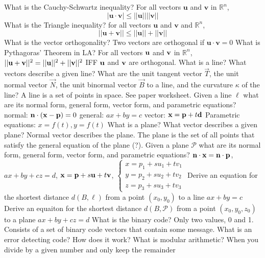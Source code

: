 \documentclass{article}
\begin{document}
\begin{outline}[enumerate]
        \1 What is the Cauchy-Schwartz inequality?
            \2 For all vectors \(\mathbf u\) and \(\mathbf v\) in \(\mathbb R^n\), \[|\mathbf{u\cdot v}|\leq ||\mathbf u||||\mathbf v||\]
        \1 What is the Triangle inequality?
            \2 for all vectors \(\mathbf u\) and \(\mathbf v\) and \(\mathbb R^n\), \[||\mathbf u+\mathbf v||\leq||\mathbf u||+||\mathbf v||\]
        \1 What is the vector orthogonality?
            \2 Two vectors are orthogonal if \(\mathbf u\cdot\mathbf v=0\)
        \1 What is Pythagoras' Theorem in LA?
            \2 For all vectors \(\vb u\) and \(\vb v\) in \(\mathbb R^n\), \(||\vb u+\vb v||^2=||\vb u||^2+||\vb v||^2\) IFF \(\vb u\) and \(\vb v\) are orthogonal. 
        \1 What is a line? What vectors describe a given line? What are the unit tangent vector \(\vec T\), the unit normal vector \(\vec N\), the unit binormal vector \(\vec B\) to a line, and the curvature \(\kappa\) of the line?
            \2 A line is a set of points in space. See paper worksheet. 
        \1 Given a line \(\ell\) what are its normal form, general form, vector form, and parametric equations?
            \2 normal: \(\vb n\cdot (\vb x-\vb p)=0\)
            \2 general: \(ax+by=c\)
            \2 vector: \(\vb x=\vb p+t\vb d\)
            \2 Parametric equations: \(x=f(t),y=f(t)\)
        \1 What is a plane? What vector describes a given plane?
            \2 Normal vector describes the plane. The plane is the set of all points that satisfy the general equation of the plane (?). 
        \1 Given a plane \(\mathcal{P}\) what are its normal form, general form, vector form, and parametric equations?
            \2 \(\vb n\cdot\vb x=\vb n\cdot\vb p\), \(ax+by+cz=d\), \(\vb x=\vb p+s\vb u+t\vb v\), \(\begin{cases}
                x=p_1+su_1+tv_1\\
                y=p_2+su_2+tv_2\\
                z=p_3+su_3+tv_3
            \end{cases}\)
        \1 Derive an equation for the shortest distance \(d(B,\ell)\) from a point \((x_0,y_0)\) to a line \(ax+by=c\)
            \2 
        \1 Derive an equaiton for the shortest distance \(d(B,\mathcal{P})\) from a point \((x_0,y_0,z_0)\) to a plane \(ax+by+cz=d\)
            \2 
        \1 What is the binary code?
            \2 Only two values, 0 and 1. Consists of a set of binary code vectors that contain some message. 
        \1 What is an error detecting code? How does it work?
            \2 
        \1 What is modular arithmetic?
            \2 When you divide by a given number and only keep the remainder
    \end{outline}
\end{document}
